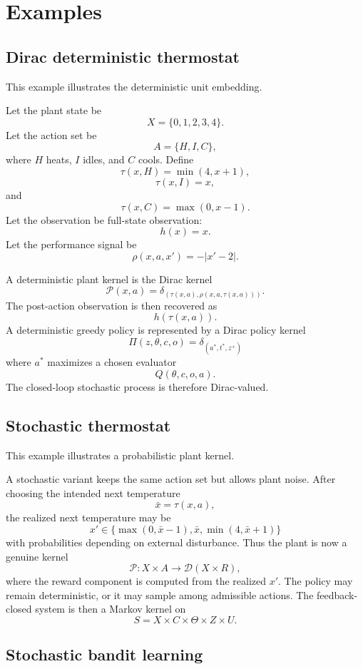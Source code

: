 \section{Examples}
\label{sec:effectful-cybernetic-examples}

\subsection{Dirac deterministic thermostat}
\label{subsec:dirac-deterministic-thermostat}

This example illustrates the deterministic unit embedding.

Let the plant state be
\[
X=\{0,1,2,3,4\}.
\]
Let the action set be
\[
A=\{H,I,C\},
\]
where \(H\) heats, \(I\) idles, and \(C\) cools.  Define
\[
\tau(x,H)=\min(4,x+1),
\]
\[
\tau(x,I)=x,
\]
and
\[
\tau(x,C)=\max(0,x-1).
\]
Let the observation be full-state observation:
\[
h(x)=x.
\]
Let the performance signal be
\[
\rho(x,a,x')=-|x'-2|.
\]

A deterministic plant kernel is the Dirac kernel
\[
\mathcal P(x,a)
=
\delta_{(\tau(x,a),\rho(x,a,\tau(x,a)))}.
\]
The post-action observation is then recovered as
\[
h(\tau(x,a)).
\]
A deterministic greedy policy is represented by a Dirac policy kernel
\[
\Pi(z,\theta,c,o)=\delta_{(a^\ast,t^\ast,z^+)}
\]
where \(a^\ast\) maximizes a chosen evaluator
\[
Q(\theta,c,o,a).
\]
The closed-loop stochastic process is therefore Dirac-valued.

\subsection{Stochastic thermostat}
\label{subsec:stochastic-thermostat}

This example illustrates a probabilistic plant kernel.

A stochastic variant keeps the same action set but allows plant noise.  After choosing the intended
next temperature
\[
\bar x=\tau(x,a),
\]
the realized next temperature may be
\[
x'\in\{\max(0,\bar x-1),\bar x,\min(4,\bar x+1)\}
\]
with probabilities depending on external disturbance.  Thus the plant is now a genuine kernel
\[
\mathcal P:X\times A\to \mathcal D(X\times R),
\]
where the reward component is computed from the realized \(x'\).  The policy may remain
deterministic, or it may sample among admissible actions.  The feedback-closed system is then a
Markov kernel on
\[
S=X\times C\times\Theta\times Z\times U.
\]

\subsection{Stochastic bandit learning}
\label{subsec:stochastic-bandit-learning}

